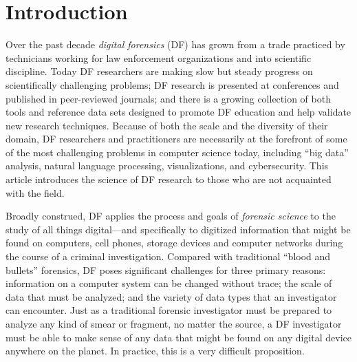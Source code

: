 

\chapter{Introduction}
Over the past decade \emph{digital forensics} (DF) has grown from a trade
practiced by technicians working for law enforcement
organizations and into scientific discipline. Today DF  researchers are
making slow but steady progress on scientifically challenging
problems; DF research is presented at conferences
and published in peer-reviewed journals; and there is a growing
collection of both tools and reference data sets designed to promote
DF education and help validate new research techniques. Because of
both the scale and the diversity of their domain, DF researchers and
practitioners are necessarily at the forefront of some of the most
challenging problems in computer science today, including ``big data''
analysis, natural language processing, visualizations, and
cybersecurity. This article introduces the science of DF research
to those who are not acquainted with the field. 

Broadly construed, DF applies the process and goals of \emph{forensic
  science} to the study of all things digital---and specifically to
digitized information that might be found on computers, cell phones,
storage devices and  computer networks during the course of a
criminal investigation. Compared with traditional ``blood and
bullets'' forensics, DF poses significant challenges for three primary
reasons: information on a computer system can be changed without 
trace; the scale of data that must be analyzed; and the variety of
data types that an investigator can encounter. Just as a traditional forensic investigator must be
prepared to analyze any kind of smear or fragment, no matter the
source, a DF investigator must be able to make sense of any data that
might be found on any digital device anywhere on the planet. In
practice, this is a very difficult proposition.

